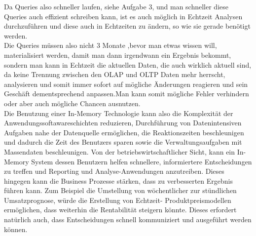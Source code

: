 Da Queries also schneller laufen, siehe Aufgabe 3, und man schneller diese Queries auch effizient schreiben kann, ist es auch möglich in Echtzeit Analysen durchzuführen und diese auch in Echtzeiten zu ändern, so wie sie gerade benötigt werden.
\\
Die Queries müssen also nicht 3 Monate ,bevor man etwas wissen will, materialisiert werden, damit man dann irgendwann ein Ergebnis bekommt, sondern man kann in Echtzeit die aktuellen Daten, die auch wirklich aktuell sind, da keine Trennung zwischen den OLAP und OLTP Daten mehr herrscht, analysieren und somit immer sofort auf mögliche Änderungen reagieren und sein Geschäft dementsprechend anpassen.Man kann somit mögliche Fehler verhindern oder aber auch mögliche Chancen ausnutzen. 
\\
Die Benutzung einer In-Memory Technologie kann also die Komplexität der Anwendungssoftawareschichten reduzieren, Durchführung von Datenintensiven Aufgaben nahe der Datenquelle ermöglichen, die Reaktionszeiten beschleunigen und dadurch die Zeit des Benutzers sparen sowie die Verwaltungsaufgaben mit Massendaten beschleunigen.
Von der betriebswirtschaftlicher Sicht, kann ein In-Memory System dessen Benutzern helfen schnellere, informiertere Entscheidungen zu treffen und Reporting und Analyse-Anwendungen anzutreiben. Dieses hingegen kann die Business Prozesse stärken, dass zu verbesserten Ergebnis führen kann. Zum Beispiel die Umstellung von wöchentlicher zur stündlichen Umsatzprognose, würde die Erstellung von Echtzeit- Produktpreismodellen ermöglichen, dass weiterhin die Rentabilität steigern könnte. Dieses erfordert natürlich auch, dass Entscheidungen schnell kommuniziert und ausgeführt werden können.
\cite{In-memory}
